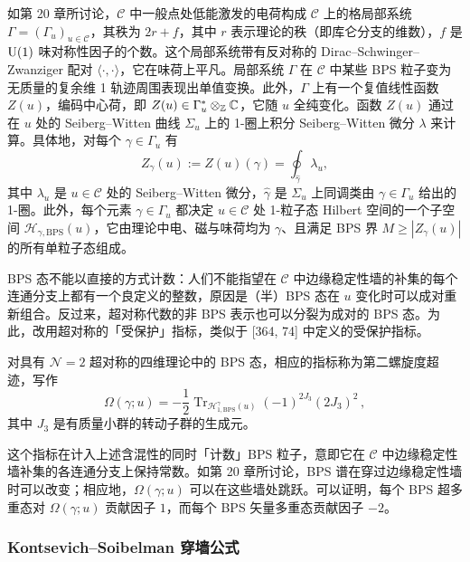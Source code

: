 如第 20 章所讨论，$\mathcal{C}$ 中一般点处低能激发的电荷构成 $\mathcal{C}$ 上的格局部系统 $\Gamma=(\Gamma_u)_{u\in\mathcal{C}}$，其秩为 $2r+f$，其中 $r$ 表示理论的秩（即库仑分支的维数），$f$ 是 $\operatorname{U}(1)$ 味对称性因子的个数。这个局部系统带有反对称的 Dirac–Schwinger–Zwanziger 配对 $\langle\cdot,\cdot\rangle$，它在味荷上平凡。局部系统 $\Gamma$ 在 $\mathcal{C}$ 中某些 BPS 粒子变为无质量的复余维 1 轨迹周围表现出单值变换。此外，$\Gamma$ 上有一个复值线性函数 $Z(u)$，编码中心荷，即 $Z(u)\in\Gamma_u^*\otimes_{\mathbb{Z}}\mathbb{C}$，它随 $u$ 全纯变化。函数 $Z(u)$ 通过在 $u$ 处的 Seiberg–Witten 曲线 $\Sigma_u$ 上的 1-圈上积分 Seiberg–Witten 微分 $\lambda$ 来计算。具体地，对每个 $\gamma\in\Gamma_u$ 有
\[
Z_\gamma(u):=Z(u)(\gamma)=\oint_{\widehat{\gamma}}\lambda_u,
\]
其中 $\lambda_u$ 是 $u\in\mathcal{C}$ 处的 Seiberg–Witten 微分，$\widehat{\gamma}$ 是 $\Sigma_u$ 上同调类由 $\gamma\in\Gamma_u$ 给出的 1-圈。此外，每个元素 $\gamma\in\Gamma_u$ 都决定 $u\in\mathcal{C}$ 处 1-粒子态 Hilbert 空间的一个子空间 $\mathcal{H}_{\gamma,\mathrm{BPS}}(u)$，它由理论中电、磁与味荷均为 $\gamma$、且满足 BPS 界 $M\ge|Z_\gamma(u)|$ 的所有单粒子态组成。

BPS 态不能以直接的方式计数：人们不能指望在 $\mathcal{C}$ 中边缘稳定性墙的补集的每个连通分支上都有一个良定义的整数，原因是（半）BPS 态在 $u$ 变化时可以成对重新组合。反过来，超对称代数的非 BPS 表示也可以分裂为成对的 BPS 态。为此，改用超对称的「受保护」指标，类似于 [364, 74] 中定义的受保护指标。

\begin{proposition}[22.10]
对具有 $\mathcal{N}=2$ 超对称的四维理论中的 BPS 态，相应的指标称为第二螺旋度超迹，写作
\begin{equation}
\Omega(\gamma;u)=-\frac{1}{2}\operatorname{Tr}_{\mathcal{H}^\gamma_{1,\mathrm{BPS}}(u)}(-1)^{2J_3}(2J_3)^2\,,\tag{22.7}
\end{equation}
其中 $J_3$ 是有质量小群的转动子群的生成元。
\end{proposition}

这个指标在计入上述含混性的同时「计数」BPS 粒子，意即它在 $\mathcal{C}$ 中边缘稳定性墙补集的各连通分支上保持常数。如第 20 章所讨论，BPS 谱在穿过边缘稳定性墙时可以改变；相应地，$\Omega(\gamma;u)$ 可以在这些墙处跳跃。可以证明，每个 BPS 超多重态对 $\Omega(\gamma;u)$ 贡献因子 $1$，而每个 BPS 矢量多重态贡献因子 $-2$。

\subsubsection*{Kontsevich–Soibelman 穿墙公式}


